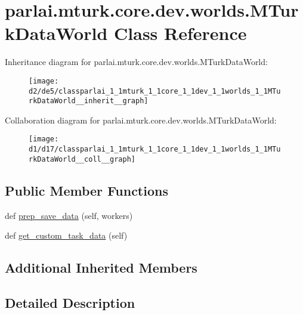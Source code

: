 \hypertarget{classparlai_1_1mturk_1_1core_1_1dev_1_1worlds_1_1MTurkDataWorld}{}\section{parlai.\+mturk.\+core.\+dev.\+worlds.\+M\+Turk\+Data\+World Class Reference}
\label{classparlai_1_1mturk_1_1core_1_1dev_1_1worlds_1_1MTurkDataWorld}


Inheritance diagram for parlai.\+mturk.\+core.\+dev.\+worlds.\+M\+Turk\+Data\+World\+:
\nopagebreak
\begin{figure}[H]
\begin{center}
\leavevmode
\texttt{[image: d2/de5/classparlai\_1\_1mturk\_1\_1core\_1\_1dev\_1\_1worlds\_1\_1MTurkDataWorld\_\_inherit\_\_graph]}
\end{center}
\end{figure}


Collaboration diagram for parlai.\+mturk.\+core.\+dev.\+worlds.\+M\+Turk\+Data\+World\+:
\nopagebreak
\begin{figure}[H]
\begin{center}
\leavevmode
\texttt{[image: d1/d17/classparlai\_1\_1mturk\_1\_1core\_1\_1dev\_1\_1worlds\_1\_1MTurkDataWorld\_\_coll\_\_graph]}
\end{center}
\end{figure}
\subsection*{Public Member Functions}
\begin{DoxyCompactItemize}
\item 
def \hyperlink{classparlai_1_1mturk_1_1core_1_1dev_1_1worlds_1_1MTurkDataWorld_ab37222b5a1e607c5f8f301de880241f2}{prep\+\_\+save\+\_\+data} (self, workers)
\item 
def \hyperlink{classparlai_1_1mturk_1_1core_1_1dev_1_1worlds_1_1MTurkDataWorld_af01360aeaa7e6ad524049621551683df}{get\+\_\+custom\+\_\+task\+\_\+data} (self)
\end{DoxyCompactItemize}
\subsection*{Additional Inherited Members}


\subsection{Detailed Description}



